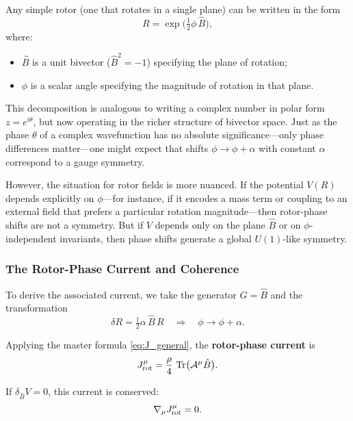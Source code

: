 \documentclass[11pt,a4paper]{article}
\numberwithin{equation}{section}
\theoremstyle{plain}
\theoremstyle{definition}
\theoremstyle{remark}
\DeclareMathOperator{\Tr}{Tr}
\begin{document}
Any simple rotor (one that rotates in a single plane) can be written in the form
\begin{equation}
R = \exp\!\big(\tfrac{1}{2}\phi\,\hat{B}\big),
\end{equation}
where:

\begin{itemize}
  \item $\hat{B}$ is a unit bivector ($\hat{B}^2 = -1$) specifying the plane of rotation;
  \item $\phi$ is a scalar angle specifying the magnitude of rotation in that plane.
\end{itemize}

This decomposition is analogous to writing a complex number in polar form $z = e^{i\theta}$, but now operating in the richer structure of bivector space. Just as the phase $\theta$ of a complex wavefunction has no absolute significance---only phase differences matter---one might expect that shifts $\phi \to \phi + \alpha$ with constant $\alpha$ correspond to a gauge symmetry.

However, the situation for rotor fields is more nuanced. If the potential $V(R)$ depends explicitly on $\phi$---for instance, if it encodes a mass term or coupling to an external field that prefers a particular rotation magnitude---then rotor-phase shifts are not a symmetry. But if $V$ depends only on the plane $\hat{B}$ or on $\phi$-independent invariants, then phase shifts generate a global $U(1)$-like symmetry.

\subsubsection{The Rotor-Phase Current and Coherence}

To derive the associated current, we take the generator $G = \hat{B}$ and the transformation
\begin{equation}
\delta R = \tfrac{1}{2}\alpha\,\hat{B}\,R \quad \Rightarrow\quad \phi \to \phi + \alpha.
\end{equation}

Applying the master formula \eqref{eq:J_general}, the \textbf{rotor-phase current} is
\begin{equation}
J^\mu_{\rm rot} = \frac{\rho}{4}\,\Tr\!\big(\mathcal{A}^\mu \hat{B}\big).
\label{eq:rotor-phase}
\end{equation}

If $\delta_{\hat{B}} V = 0$, this current is conserved:
\begin{equation}
\nabla_\mu J^\mu_{\rm rot} = 0.
\end{equation}
\end{document}
